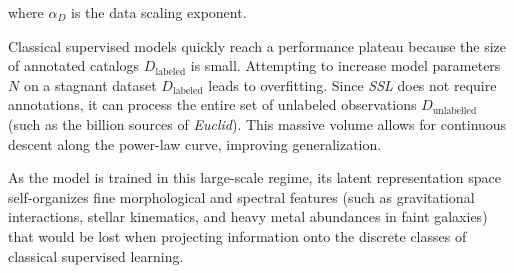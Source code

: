 where $\alpha_D$ is the data scaling exponent.

Classical supervised models quickly reach a performance plateau because the size of annotated catalogs $D_{\text{labeled}}$ is small. Attempting to increase model parameters $N$ on a stagnant dataset $D_{\text{labeled}}$ leads to overfitting. Since \textit{\gls{SSL}} does not require annotations, it can process the entire set of unlabeled observations $D_{\text{unlabelled}}$ (such as the billion sources of \textit{Euclid}). This massive volume allows for continuous descent along the power-law curve, improving generalization.

As the model is trained in this large-scale regime, its latent representation space self-organizes fine morphological and spectral features (such as gravitational interactions, stellar kinematics, and heavy metal abundances in faint galaxies) that would be lost when projecting information onto the discrete classes of classical supervised learning.
